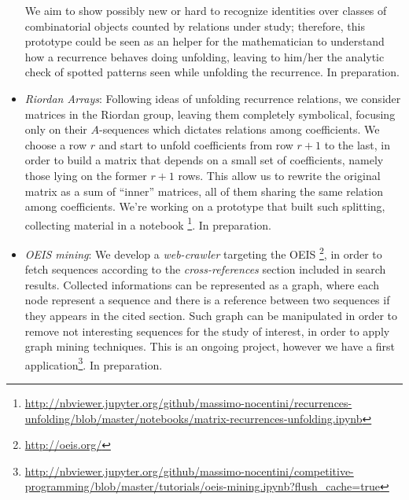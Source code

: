 \documentclass[10pt,a4paper]{scrartcl}
\begin{document}
\begin{itemize}
            We aim to show possibly new or hard to recognize identities over classes of combinatorial objects counted by
            relations under study; therefore, this prototype could be seen as an helper for the mathematician to understand
            how a recurrence behaves doing unfolding, leaving to him/her the analytic check of spotted patterns seen 
            while unfolding the recurrence. In preparation.

        \item \emph{Riordan Arrays}: Following ideas of unfolding recurrence relations, we consider matrices in the Riordan group,
            leaving them completely symbolical, focusing only on their $A$-sequences which dictates relations among coefficients.
            We choose a row $r$ and start to unfold coefficients from row $r+1$ to the last, in order to build a matrix that 
            depends on a small set of coefficients, namely those lying on the former $r+1$ rows. This allow us to rewrite
            the original matrix as a sum of ``inner'' matrices, all of them sharing the same relation among coefficients.
            We're working on a prototype that built such splitting, collecting material in a notebook
            \footnote{\url{http://nbviewer.jupyter.org/github/massimo-nocentini/recurrences-unfolding/blob/master/notebooks/matrix-recurrences-unfolding.ipynb}}.
            In preparation.

        \item\emph{OEIS mining}: We develop a \emph{web-crawler} targeting the OEIS \footnote{\url{http://oeis.org/}}, in order
            to fetch sequences according to the \emph{cross-references} section included in search results. Collected 
            informations can be represented as a graph, where each node represent a sequence and there is a reference
            between two sequences if they appears in the cited section. Such graph can be manipulated in order to remove
            not interesting sequences for the study of interest, in order to apply graph mining techniques. This is an
            ongoing project, however we have a first application\footnote{\url{http://nbviewer.jupyter.org/github/massimo-nocentini/competitive-programming/blob/master/tutorials/oeis-mining.ipynb?flush_cache=true}}. In preparation.


\end{itemize}
\end{document}
